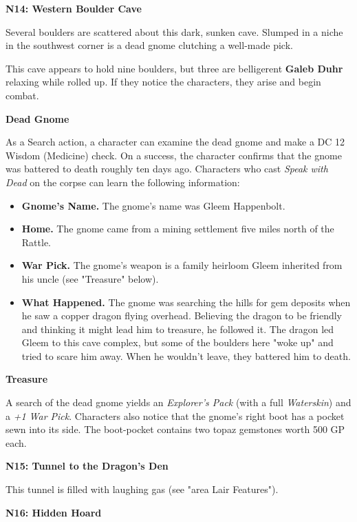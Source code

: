 \documentclass[letterpaper, 11pt, twocolumn]{dndbook}
\begin{document}
\textbf{N14: Western Boulder Cave}

\begin{DndReadAloud}
Several boulders are scattered about this dark, sunken cave. Slumped in a niche in the southwest corner is a dead gnome clutching a well-made pick.
\end{DndReadAloud}

This cave appears to hold nine boulders, but three are belligerent \textbf{Galeb Duhr} relaxing while rolled up. If they notice the characters, they arise and begin combat.

\textbf{Dead Gnome}

As a Search action, a character can examine the dead gnome and make a DC 12 Wisdom (Medicine) check. On a success, the character confirms that the gnome was battered to death roughly ten days ago. Characters who cast \textit{Speak with Dead} on the corpse can learn the following information:

\begin{itemize}
\item \textbf{Gnome's Name.} The gnome's name was Gleem Happenbolt.
\item \textbf{Home.} The gnome came from a mining settlement five miles north of the Rattle.
\item \textbf{War Pick.} The gnome's weapon is a family heirloom Gleem inherited from his uncle (see "Treasure" below).
\item \textbf{What Happened.} The gnome was searching the hills for gem deposits when he saw a copper dragon flying overhead. Believing the dragon to be friendly and thinking it might lead him to treasure, he followed it. The dragon led Gleem to this cave complex, but some of the boulders here "woke up" and tried to scare him away. When he wouldn't leave, they battered him to death.
\end{itemize}

\textbf{Treasure}

A search of the dead gnome yields an \textit{Explorer's Pack} (with a full \textit{Waterskin}) and a \textit{+1 War Pick}. Characters also notice that the gnome's right boot has a pocket sewn into its side. The boot-pocket contains two topaz gemstones worth 500 GP each.

\textbf{N15: Tunnel to the Dragon's Den}

This tunnel is filled with laughing gas (see "area Lair Features").

\textbf{N16: Hidden Hoard}
\end{document}
